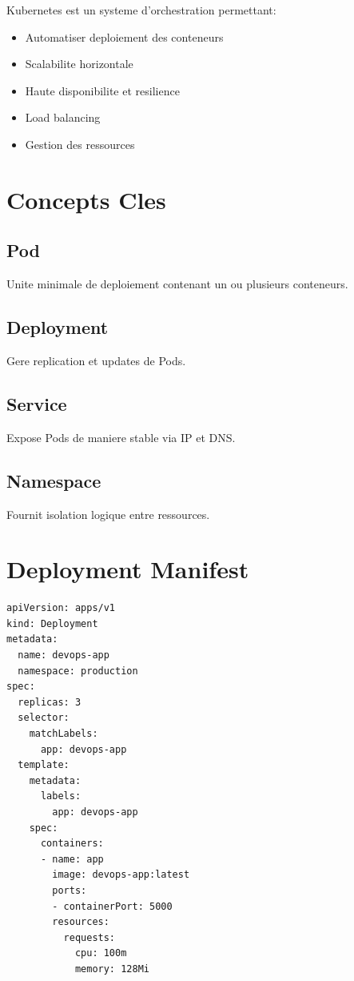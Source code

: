 \documentclass[12pt,a4paper]{report}
\begin{document}
Kubernetes est un systeme d'orchestration permettant:
\begin{itemize}
    \item Automatiser deploiement des conteneurs
    \item Scalabilite horizontale
    \item Haute disponibilite et resilience
    \item Load balancing
    \item Gestion des ressources
\end{itemize}

\section{Concepts Cles}

\subsection{Pod}
Unite minimale de deploiement contenant un ou plusieurs conteneurs.

\subsection{Deployment}
Gere replication et updates de Pods.

\subsection{Service}
Expose Pods de maniere stable via IP et DNS.

\subsection{Namespace}
Fournit isolation logique entre ressources.

\section{Deployment Manifest}

\begin{lstlisting}
apiVersion: apps/v1
kind: Deployment
metadata:
  name: devops-app
  namespace: production
spec:
  replicas: 3
  selector:
    matchLabels:
      app: devops-app
  template:
    metadata:
      labels:
        app: devops-app
    spec:
      containers:
      - name: app
        image: devops-app:latest
        ports:
        - containerPort: 5000
        resources:
          requests:
            cpu: 100m
            memory: 128Mi
\end{lstlisting}
\end{document}
